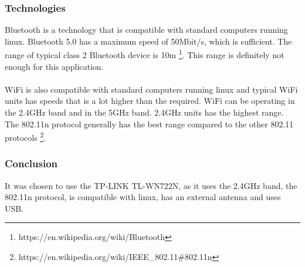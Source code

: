 \subsubsection{Technologies}
Bluetooth is a technology that is compatible with standard computers running linux. 
Bluetooth 5.0 has a maximum speed of 50Mbit/s, which is sufficient.
The range of typical class 2 Bluetooth device is 10m \footnote{https://en.wikipedia.org/wiki/Bluetooth}.
This range is definitely not enough for this application.
\\
\\  
WiFi is also compatible with standard computers running linux and typical WiFi units has speeds that is a lot higher than the required. 
WiFi can be operating in the 2.4GHz band and in the 5GHz band. 
2.4GHz units has the highest range. 
The 802.11n protocol generally has the best range compared to the other 802.11 protocols \footnote{https://en.wikipedia.org/wiki/IEEE\_802.11\#802.11n}.

\subsubsection{Conclusion} 
It was chosen to use the TP-LINK TL-WN722N, as it uses the 2.4GHz band, the 802.11n protocol, is compatible with linux, has an external antenna and uses USB. 
